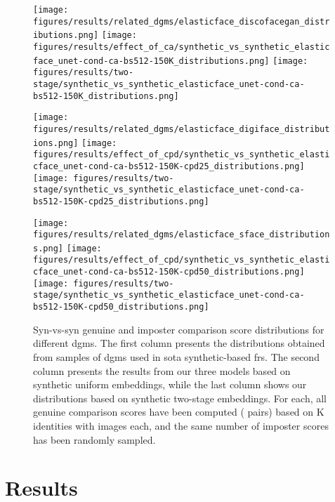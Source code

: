 \documentclass[10pt,twocolumn,letterpaper]{article}
\begin{document}
\begin{figure}[h]
\begin{center}

  \texttt{[image: figures/results/related\_dgms/elasticface\_discofacegan\_distributions.png]}
  \texttt{[image: figures/results/effect\_of\_ca/synthetic\_vs\_synthetic\_elasticface\_unet-cond-ca-bs512-150K\_distributions.png]}
  \texttt{[image: figures/results/two-stage/synthetic\_vs\_synthetic\_elasticface\_unet-cond-ca-bs512-150K\_distributions.png]}

  \texttt{[image: figures/results/related\_dgms/elasticface\_digiface\_distributions.png]}
  \texttt{[image: figures/results/effect\_of\_cpd/synthetic\_vs\_synthetic\_elasticface\_unet-cond-ca-bs512-150K-cpd25\_distributions.png]}
  \texttt{[image: figures/results/two-stage/synthetic\_vs\_synthetic\_elasticface\_unet-cond-ca-bs512-150K-cpd25\_distributions.png]}

  \texttt{[image: figures/results/related\_dgms/elasticface\_sface\_distributions.png]}
  \texttt{[image: figures/results/effect\_of\_cpd/synthetic\_vs\_synthetic\_elasticface\_unet-cond-ca-bs512-150K-cpd50\_distributions.png]}
  \texttt{[image: figures/results/two-stage/synthetic\_vs\_synthetic\_elasticface\_unet-cond-ca-bs512-150K-cpd50\_distributions.png]}
\end{center}
   \vspace{-5mm}
   \caption{Syn-vs-syn genuine and imposter comparison score distributions for different \acrshort{dgm}s. The first column presents the distributions obtained from samples of \acrshort{dgm}s used in \acrshort{sota} synthetic-based \acrshort{fr}s. The second column presents the results from our three models based on synthetic uniform embeddings, while the last column shows our distributions based on synthetic two-stage embeddings. For each, all genuine comparison scores have been computed ( pairs) based on  K identities with  images each, and the same number of imposter scores has been randomly sampled.}
\label{fig:syn_vs_syn_distributios_overview}
\vspace{-3mm}
\end{figure}

\vspace{-4mm}
\section{Results}
\vspace{-2mm}
\end{document}
